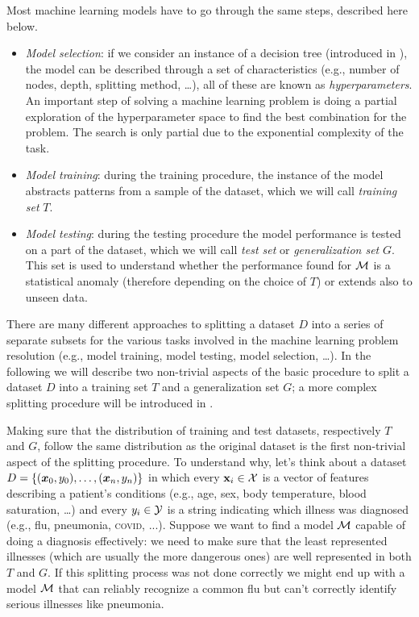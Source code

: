 Most machine learning models have to go through the same steps, described here below.
\begin{itemize}
	\item \emph{Model selection}: if we consider an instance of a decision tree (introduced in
	      ), the model can be described through a set of characteristics (e.g.,
	      number of nodes, depth, splitting method, \ldots), all of these are known as
	      \emph{hyperparameters}. An important step of solving a machine learning problem is
	      doing a partial exploration of the hyperparameter space to find the best combination
		for the problem. The search is only partial due to the exponential complexity of the task.
	\item \emph{Model training}: during the training procedure, the instance of the model abstracts
	      patterns from a sample of the dataset, which we will call \emph{training set} $T$.
	\item \emph{Model testing}: during the testing procedure the model performance is tested on
		a part of the dataset, which we will call \emph{test set} or \emph{generalization
		set} $G$. This set is used to understand whether the performance found for $\mathcal{M}$
		is a statistical anomaly (therefore depending on the choice of $T$) or extends also to unseen data.
\end{itemize}

There are many different approaches to splitting a dataset $D$ into a series of separate subsets
for the various tasks involved in the machine learning problem resolution (e.g., model training,
model testing, model selection, \ldots). In the following we will describe two non-trivial aspects of
the basic procedure to split a dataset $D$ into a training set $T$ and a generalization set $G$; a
more complex splitting procedure will be introduced in .

\smallskip

Making sure that the distribution of training and test datasets, respectively $T$ and $G$, follow the
same distribution as the original dataset is the first non-trivial aspect of the splitting
procedure. To understand why, let's think about a dataset $D = \{(\boldsymbol{x}_0, y_0), \allowbreak\ldots\allowbreak, (\boldsymbol{x}_n, y_n)\}$ in which every $\mathbf{x}_i \in
\mathcal{X}$ is a vector of features describing a patient's conditions (e.g., age, sex, body temperature,
blood saturation, \ldots) and every $y_i \in \mathcal{Y}$ is a string indicating which illness was
diagnosed (e.g., flu, pneumonia, \textsc{covid}, ...). Suppose we want to find a model $\mathcal{M}$ capable of doing a diagnosis effectively: we need to make sure that the least represented illnesses (which are usually the more dangerous ones) are well represented in both $T$ and $G$. If this splitting process was not done correctly we might end up with a model $\mathcal{M}$ that can reliably recognize a common flu but can't correctly identify serious illnesses like pneumonia.


